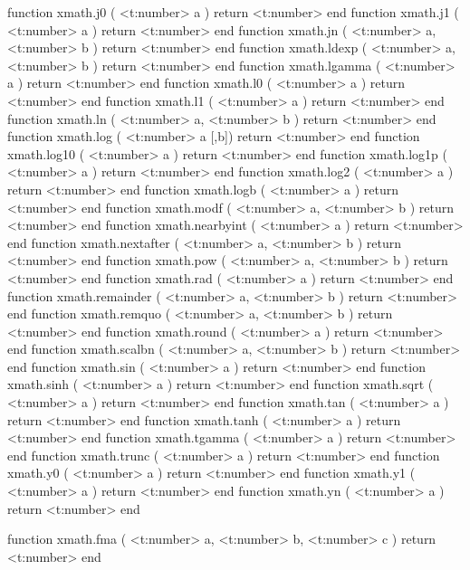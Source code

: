 function xmath.j0         ( <t:number> a )               return <t:number> end
function xmath.j1         ( <t:number> a )               return <t:number> end
function xmath.jn         ( <t:number> a, <t:number> b ) return <t:number> end
function xmath.ldexp      ( <t:number> a, <t:number> b ) return <t:number> end
function xmath.lgamma     ( <t:number> a )               return <t:number> end
function xmath.l0         ( <t:number> a )               return <t:number> end
function xmath.l1         ( <t:number> a )               return <t:number> end
function xmath.ln         ( <t:number> a, <t:number> b ) return <t:number> end
function xmath.log        ( <t:number> a [,b])           return <t:number> end
function xmath.log10      ( <t:number> a )               return <t:number> end
function xmath.log1p      ( <t:number> a )               return <t:number> end
function xmath.log2       ( <t:number> a )               return <t:number> end
function xmath.logb       ( <t:number> a )               return <t:number> end
function xmath.modf       ( <t:number> a, <t:number> b ) return <t:number> end
function xmath.nearbyint  ( <t:number> a )               return <t:number> end
function xmath.nextafter  ( <t:number> a, <t:number> b ) return <t:number> end
function xmath.pow        ( <t:number> a, <t:number> b ) return <t:number> end
function xmath.rad        ( <t:number> a )               return <t:number> end
function xmath.remainder  ( <t:number> a, <t:number> b ) return <t:number> end
function xmath.remquo     ( <t:number> a, <t:number> b ) return <t:number> end
function xmath.round      ( <t:number> a )               return <t:number> end
function xmath.scalbn     ( <t:number> a, <t:number> b ) return <t:number> end
function xmath.sin        ( <t:number> a )               return <t:number> end
function xmath.sinh       ( <t:number> a )               return <t:number> end
function xmath.sqrt       ( <t:number> a )               return <t:number> end
function xmath.tan        ( <t:number> a )               return <t:number> end
function xmath.tanh       ( <t:number> a )               return <t:number> end
function xmath.tgamma     ( <t:number> a )               return <t:number> end
function xmath.trunc      ( <t:number> a )               return <t:number> end
function xmath.y0         ( <t:number> a )               return <t:number> end
function xmath.y1         ( <t:number> a )               return <t:number> end
function xmath.yn         ( <t:number> a )               return <t:number> end

function xmath.fma (
    <t:number> a,
    <t:number> b,
    <t:number> c
)
    return <t:number>
end
\stoptyping

